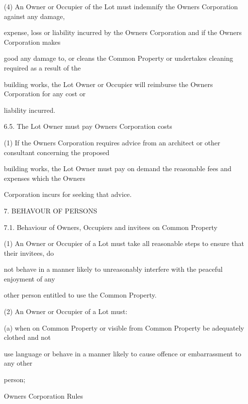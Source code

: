 \documentclass{article}
\begin{document}
{\fontsize{9.962}{1}(4) An Owner or Occupier of the Lot must indemnify the Owners Corporation against any damage, }

{\fontsize{10.02}{1}expense, loss or liability incurred by the Owners Corporation and if the Owners Corporation makes }

{\fontsize{10.02}{1}good any damage to, or cleans the Common Property or undertakes cleaning required as a result of the }

{\fontsize{10.02}{1}building works, the Lot Owner or Occupier will reimburse the Owners Corporation for any cost or }

{\fontsize{10.02}{1}liability incurred. }

{\fontsize{9.99}{1}6.5. The Lot Owner must pay Owners Corporation costs }

{\fontsize{9.962}{1}(1) If the Owners Corporation requires advice from an architect or other consultant concerning the proposed }

{\fontsize{10.02}{1}building works, the Lot Owner must pay on demand the reasonable fees and expenses which the Owners }

{\fontsize{10.02}{1}Corporation incurs for seeking that advice. }


{\fontsize{9.99}{1}7. BEHAVOUR OF PERSONS }

{\fontsize{9.99}{1}7.1. Behaviour of Owners, Occupiers and invitees on Common Property }

{\fontsize{9.962}{1}(1) An Owner or Occupier of a Lot must take all reasonable steps to ensure that their invitees, do }

{\fontsize{10.02}{1}not behave in a manner likely to unreasonably interfere with the peaceful enjoyment of any }

{\fontsize{10.02}{1}other person entitled to use the Common Property. }

{\fontsize{9.962}{1}(2) An Owner or Occupier of a Lot must: }

{\fontsize{9.962}{1}(a) when on Common Property or visible from Common Property be adequately clothed and not }

{\fontsize{10.02}{1}use language or behave in a manner likely to cause offence or embarrassment to any other }

{\fontsize{10.02}{1}person; }

\newpage





{\fontsize{9}{1}Owners Corporation Rules }
\end{document}
